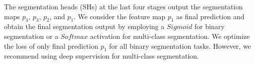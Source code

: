 The segmentation heads (SHs) at the last four stages output the segmentation maps $p_4$, $p_3$, $p_2$, and $p_1$. We consider the feature map $p_1$ as final prediction and obtain the final segmentation output by employing a $Sigmoid$ for binary segmentation or a $Softmax$ activation for multi-class segmentation. We optimize the loss of only final prediction $p_1$ for all binary segmentation tasks. However, we recommend using deep supervision for multi-class segmentation.


    


